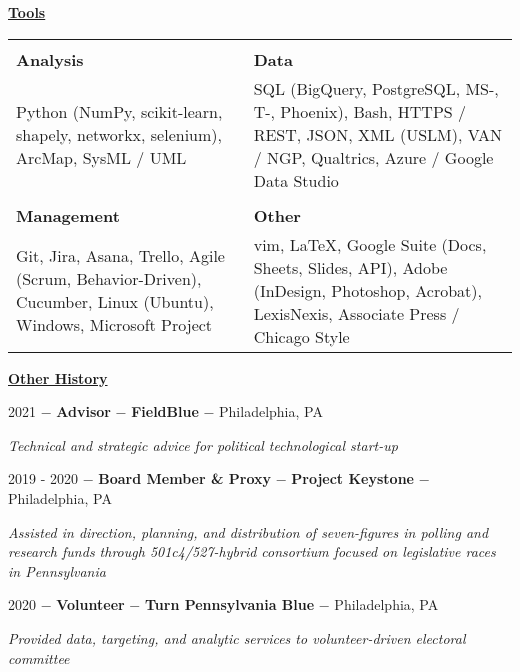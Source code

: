 \documentclass[8pt]{article}
\begin{document}
\begin{center}
	\textbf{\underline{\Large{Tools}}} \\
	\begin{tabular}{ p{8cm} p{8cm} }
		 & \\
		\textbf{Analysis} & \textbf{Data} \\
		Python (NumPy, scikit-learn, shapely, networkx, selenium), ArcMap, SysML / UML & SQL (BigQuery, PostgreSQL, MS-, T-, Phoenix), Bash, HTTPS / REST, JSON,  XML (USLM),  VAN / NGP, Qualtrics, Azure / Google Data Studio \\
		 & \\
		\textbf{Management} & \textbf{Other} \\
		Git, Jira, Asana, Trello, Agile (Scrum, Behavior-Driven), Cucumber, Linux (Ubuntu), Windows, Microsoft Project & vim, \LaTeX, Google Suite (Docs, Sheets, Slides, API), Adobe (InDesign, Photoshop, Acrobat), LexisNexis, Associate Press / Chicago Style \\
	\end{tabular}
\end{center}

\begin{center}
	\textbf{\underline{\Large{Other History}}}
\end{center}

2021 $-$ \textbf{Advisor} $-$ \textbf{FieldBlue} $-$ Philadelphia, PA
\begin{adjustwidth}{1cm}{1cm}
	\textit{Technical and strategic advice for political technological start-up}\\
\end{adjustwidth}


2019 - 2020  $-$ \textbf{Board Member \& Proxy} $-$ \textbf{Project Keystone} $-$  Philadelphia, PA
\begin{adjustwidth}{1cm}{1cm}
	\textit{Assisted in direction, planning, and distribution of seven-figures in polling and research funds through 501c4/527-hybrid consortium focused on legislative races in Pennsylvania}\\
\end{adjustwidth}

2020 $-$ \textbf{Volunteer} $-$ \textbf{Turn Pennsylvania Blue} $-$ Philadelphia, PA
\begin{adjustwidth}{1cm}{1cm}
	\textit{Provided data, targeting, and analytic services to volunteer-driven electoral committee}\\
\end{adjustwidth}
\end{document}

